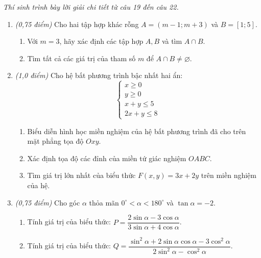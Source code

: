 \documentclass[12pt,a4paper]{article}
\newcommand{\parttitle}[1]{\par\vspace{2pt}\nopagebreak{\large\bfseries\color{ink}#1}\par\nopagebreak\vspace{1pt}}
\begin{document}
\parttitle{PHẦN IV. Tự luận}
\textit{Thí sinh trình bày lời giải chi tiết từ câu 19 đến câu 22.}
\begin{enumerate}[resume]
\item \textit{(0,75 điểm)} Cho hai tập hợp khác rỗng $A = (m - 1; m + 3)$ và $B = [1; 5]$.
\begin{enumerate}
    \item Với $m = 3$, hãy xác định các tập hợp $A, B$ và tìm $A \cap B$.
    \item Tìm tất cả các giá trị của tham số $m$ để $A \cap B \ne \varnothing$.
\end{enumerate}

\item \textit{(1,0 điểm)} Cho hệ bất phương trình bậc nhất hai ẩn:
\[
\begin{cases}
x \ge 0 \\
y \ge 0 \\
x + y \le 5 \\
2x + y \le 8
\end{cases}
\]
\begin{enumerate}
    \item Biểu diễn hình học miền nghiệm của hệ bất phương trình đã cho trên mặt phẳng tọa độ $Oxy$.
    \item Xác định tọa độ các đỉnh của miền tứ giác nghiệm $OABC$.
    \item Tìm giá trị lớn nhất của biểu thức $F(x, y) = 3x + 2y$ trên miền nghiệm của hệ.
\end{enumerate}

\item \textit{(0,75 điểm)} Cho góc $\alpha$ thỏa mãn $0^\circ < \alpha < 180^\circ$ và $\tan \alpha = -2$.
\begin{enumerate}
    \item Tính giá trị của biểu thức: $P = \dfrac{2\sin \alpha - 3\cos \alpha}{3\sin \alpha + 4\cos \alpha}$.
    \item Tính giá trị của biểu thức: $Q = \dfrac{\sin^2 \alpha + 2\sin \alpha \cos \alpha - 3\cos^2 \alpha}{2\sin^2 \alpha - \cos^2 \alpha}$.
\end{enumerate}


\end{enumerate}
\end{document}
